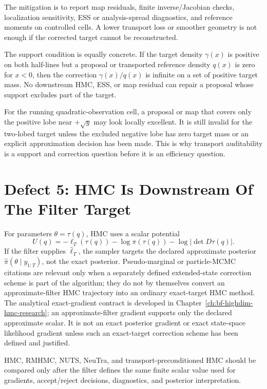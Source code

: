 The mitigation is to report map residuals, finite inverse/Jacobian checks,
localization sensitivity, ESS or analysis-spread diagnostics, and reference
moments on controlled cells.  A lower transport loss or smoother geometry is
not enough if the corrected target cannot be reconstructed.

The support condition is equally concrete.  If the target density
\(\gamma(x)\) is positive on both half-lines but a proposal or transported
reference density \(q(x)\) is zero for \(x<0\), then the correction
\(\gamma(x)/q(x)\) is infinite on a set of positive target mass.  No downstream
HMC, ESS, or map residual can repair a proposal whose support excludes part of
the target.

For the running quadratic-observation cell, a proposal or map that covers only
the positive lobe near \(+\sqrt y\) may look locally excellent.  It is still
invalid for the two-lobed target unless the excluded negative lobe has zero
target mass or an explicit approximation decision has been made.  This is why
transport auditability is a support and correction question before it is an
efficiency question.

\section{Defect 5: HMC Is Downstream Of The Filter Target}
\label{sec:bf-hd-defect-hmc}

For parameters \(\theta=\tau(q)\), HMC uses a scalar potential
\begin{equation}
  U(q)=-\ell_T(\tau(q))-\log\pi(\tau(q))
       -\log|\det D\tau(q)|.
  \label{eq:bf-hd-synth-hmc-target}
\end{equation}
If the filter supplies \(\widehat\ell_T\), the sampler targets the declared
approximate posterior \(\widehat\pi(\theta\mid y_{1:T})\), not the exact
posterior.  Pseudo-marginal or particle-MCMC citations are relevant only when a
separately defined extended-state correction scheme is part of the algorithm;
they do not by themselves convert an approximate-filter HMC trajectory into an
ordinary exact-target HMC method.  The analytical exact-gradient contract is
developed in Chapter~\ref{ch:bf-highdim-hmc-research}; an approximate-filter
gradient supports only the declared approximate scalar.  It is not an exact
posterior gradient or exact state-space likelihood gradient unless such an
exact-target correction scheme has been defined and justified.

\begin{proposition}
\label{prop:bf-hd-hmc-downstream}
HMC, RMHMC, NUTS, NeuTra, and transport-preconditioned HMC should be compared
only after the filter defines the same finite scalar value used for gradients,
accept/reject decisions, diagnostics, and posterior interpretation.
\end{proposition}

